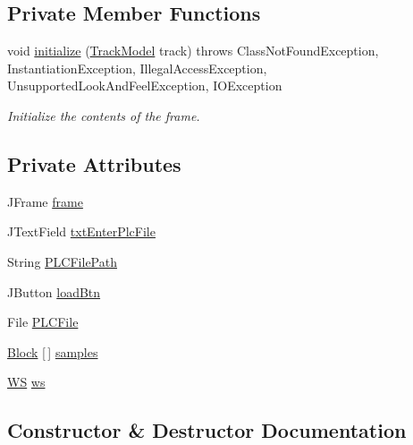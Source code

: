 \subsection*{Private Member Functions}
\begin{DoxyCompactItemize}
\item 
void \hyperlink{classWaysideController_1_1WaysideGuiMain_a6f96f3a1fdd7cf7a05c281be97387413}{initialize} (\hyperlink{classTrackModel_1_1TrackModel}{Track\+Model} track)  throws Class\+Not\+Found\+Exception, Instantiation\+Exception, Illegal\+Access\+Exception, Unsupported\+Look\+And\+Feel\+Exception, I\+O\+Exception 
\begin{DoxyCompactList}\small\item\em Initialize the contents of the frame. \end{DoxyCompactList}\end{DoxyCompactItemize}
\subsection*{Private Attributes}
\begin{DoxyCompactItemize}
\item 
J\+Frame \hyperlink{classWaysideController_1_1WaysideGuiMain_a7bb363eb04328d1213e193d5710462c9}{frame}
\item 
J\+Text\+Field \hyperlink{classWaysideController_1_1WaysideGuiMain_a1fc195348c67f797d2319ef0ae9e7e21}{txt\+Enter\+Plc\+File}
\item 
String \hyperlink{classWaysideController_1_1WaysideGuiMain_a09e20ab379be966f13ef09a488b0d582}{P\+L\+C\+File\+Path}
\item 
J\+Button \hyperlink{classWaysideController_1_1WaysideGuiMain_a6024b79350afc61454bea1574e16701d}{load\+Btn}
\item 
File \hyperlink{classWaysideController_1_1WaysideGuiMain_a2971e6ce2f729012928bdbf69caf7ab2}{P\+L\+C\+File}
\item 
\hyperlink{classTrackModel_1_1Block}{Block} \mbox{[}$\,$\mbox{]} \hyperlink{classWaysideController_1_1WaysideGuiMain_ad43fe7fd3d059b7f994c52e90d72fb68}{samples}
\item 
\hyperlink{classWaysideController_1_1WS}{WS} \hyperlink{classWaysideController_1_1WaysideGuiMain_a10516fa6d5db77d5935135af8b0446c9}{ws}
\end{DoxyCompactItemize}


\subsection{Constructor \& Destructor Documentation}
\mbox{\label{classWaysideController_1_1WaysideGuiMain_af5c9eea089aa061d0f027ccd27a458db}} 
